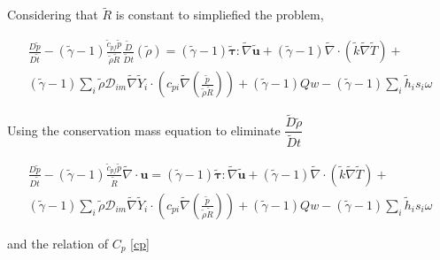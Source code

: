 \documentclass[preprint,12pt,authoryear]{elsarticle}
\begin{document}
Considering that $\tilde{R}$ is constant to simpliefied the problem,

\begin{equation}
\begin{split}
        \frac{D \tilde{p}}{D\tilde{t}}
	-
	(\tilde{\gamma}-1)
	\frac{\tilde{c}_{pf} \tilde{p}   }{\tilde{\rho}\tilde{R}}
        \frac{\tilde{D}}{\tilde{D} t}
	(
	\tilde{\rho}
	)
        =
	(\tilde{\gamma}-1)
        \pmb{\tilde{\tau}}:\tilde{\nabla} \tilde{\mathbf{u}} 
        + 
	(\tilde{\gamma}-1)
        \tilde{\nabla} \cdot (\tilde{k}\tilde{\nabla} \tilde{T})
        +
	\\
	(\tilde{\gamma}-1)
        \sum\limits_i 
        \tilde{\rho}
        \mathcal{D}_{im}
        \tilde{\nabla}
        \tilde{Y}_i     
        \cdot
        \left(
                c_{pi}
                \tilde{\nabla}
                \left(
                	\frac{\tilde{p}}{\tilde{\rho}\tilde{R}}
                \right)
        \right)
	+
	(\tilde{\gamma}-1)
	Qw
	-
	(\tilde{\gamma}-1)
        \sum\limits_i
	\tilde{h}_i
        s_i \omega	
\end{split}
\end{equation}

Using the conservation mass equation 
to eliminate $\dfrac{\tilde{D}\tilde{\rho}}{\tilde{D}t}$

\begin{equation}
\begin{split}
        \frac{D \tilde{p}}{D\tilde{t}}
	-
	(\tilde{\gamma}-1)
	\frac{\tilde{c}_{pf} \tilde{p} }  {\tilde{R}}
	\tilde{\nabla}\cdot{\mathbf{u}}
        =
	(\tilde{\gamma}-1)
        \pmb{\tilde{\tau}}:\tilde{\nabla} \tilde{\mathbf{u}} 
        + 
	(\tilde{\gamma}-1)
        \tilde{\nabla} \cdot (\tilde{k}\tilde{\nabla} \tilde{T})
        +
	\\
	(\tilde{\gamma}-1)
        \sum\limits_i 
        \tilde{\rho}
        \mathcal{D}_{im}
        \tilde{\nabla}
        \tilde{Y}_i     
        \cdot
        \left(
                c_{pi}
                \tilde{\nabla}
                \left(
                	\frac{\tilde{p}}{\tilde{\rho}\tilde{R}}
                \right)
        \right)
	+
	(\tilde{\gamma}-1)
	Qw
	-
	(\tilde{\gamma}-1)
        \sum\limits_i
	\tilde{h}_i
        s_i \omega	
\end{split}
\end{equation}

and the relation of $C_p$ \ref{cp} 
\end{document}
